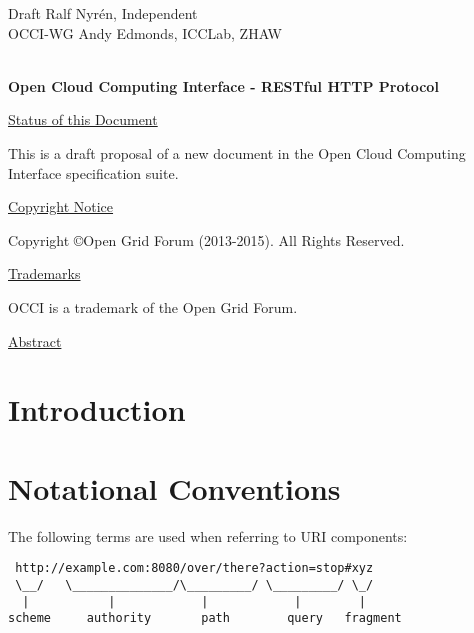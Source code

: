 \documentclass[10pt,a4paper]{article}
\begin{document}
\thispagestyle{empty}

Draft \hfill Ralf Nyrén, Independent \\
OCCI-WG \hfill Andy Edmonds, ICCLab, ZHAW \\
\\

\vspace*{0.5in}

\begin{Large}
\textbf{Open Cloud Computing Interface - RESTful HTTP Protocol}
\end{Large}

\vspace*{0.5in}

\underline{Status of this Document}

%
This is a draft proposal of a new document in the Open Cloud Computing
Interface specification suite.

\underline{Copyright Notice}

Copyright \copyright Open Grid Forum (2013-2015). All Rights Reserved.

\underline{Trademarks}

OCCI is a trademark of the Open Grid Forum.

\underline{Abstract}




\newpage
\tableofcontents
\newpage

\section{Introduction}


\section{Notational Conventions}


The following terms \cite{rfc3986} are used when referring to URI
components:

\begin{verbatim}
 http://example.com:8080/over/there?action=stop#xyz
 \__/   \______________/\_________/ \_________/ \_/
  |           |            |            |        |
scheme     authority       path        query   fragment
\end{verbatim}
\end{document}
